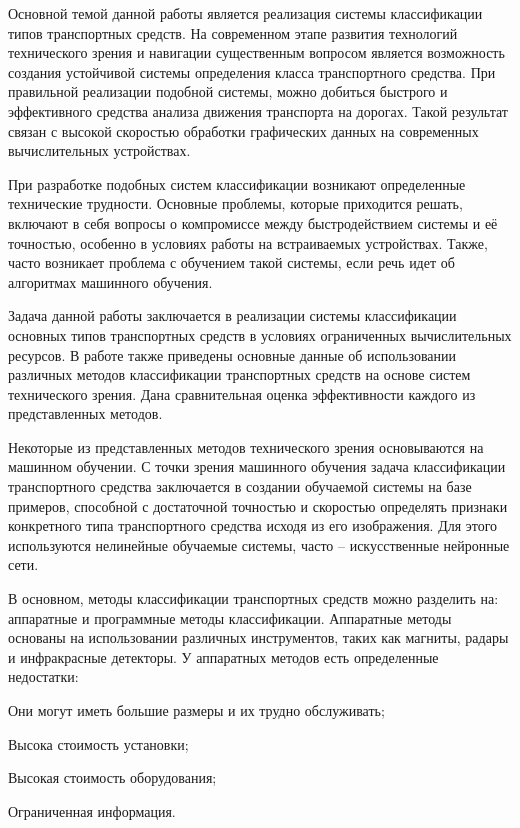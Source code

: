 \intro

Основной темой данной работы является реализация системы классификации типов транспортных средств. На современном этапе развития технологий технического зрения и навигации существенным вопросом является возможность создания устойчивой системы определения класса транспортного средства. При правильной реализации подобной системы, можно добиться быстрого и эффективного средства анализа движения транспорта на дорогах. Такой результат связан с высокой скоростью обработки графических данных на современных вычислительных устройствах. 

При разработке подобных систем классификации возникают определенные технические трудности. Основные проблемы, которые приходится решать, включают в себя вопросы о компромиссе между быстродействием системы и её точностью, особенно в условиях работы на встраиваемых устройствах. Также, часто возникает проблема с обучением такой системы, если речь идет об алгоритмах машинного обучения.

Задача данной работы заключается в реализации системы классификации основных типов транспортных средств в условиях ограниченных вычислительных ресурсов. В работе также приведены основные данные об использовании различных методов классификации транспортных средств на основе систем технического зрения. Дана сравнительная оценка эффективности каждого из представленных методов. 

Некоторые из представленных методов технического зрения основываются на машинном обучении. С точки зрения машинного обучения задача классификации транспортного средства заключается в создании обучаемой системы на базе примеров, способной с достаточной точностью и скоростью определять признаки конкретного типа транспортного средства исходя из его изображения. Для этого используются нелинейные обучаемые системы, часто – искусственные нейронные сети. 

В основном, методы классификации транспортных средств можно разделить на: аппаратные и программные методы классификации. Аппаратные методы основаны на использовании различных инструментов, таких как магниты, радары и инфракрасные детекторы. У аппаратных методов есть определенные недостатки:
%
\begin{itemize*}
  \item Они могут иметь большие размеры и их трудно обслуживать;
  \item Высока стоимость установки;
  \item Высокая стоимость оборудования;
  \item Ограниченная информация.
\end{itemize*}
%

